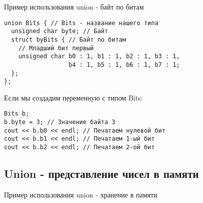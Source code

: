 \begin{frame}[t,fragile]{Пример использования union - байт по битам}
\begin{lstlisting}
union Bits { // Bits - название нашего типа
  unsigned char byte; // Байт
  struct byBits { // Байт по битам
    // Младший бит первый
    unsigned char b0 : 1, b1 : 1, b2 : 1, b3 : 1,
                  b4 : 1, b5 : 1, b6 : 1, b7 : 1;
  };
};
\end{lstlisting}

Если мы создадим переменную с типом Bits:
\begin{lstlisting}
Bits b;
b.byte = 3; // Значение байта 3 
cout << b.b0 << endl; // Печатаем нулевой бит
cout << b.b1 << endl; // Печатаем 1-ый бит
cout << b.b2 << endl; // Печатаем 2-ой бит
\end{lstlisting}
\end{frame}

\subsection{Union - представление чисел в памяти}
\begin{frame}[t,fragile]{Пример использования union - хранение в памяти}
  
\end{frame}


